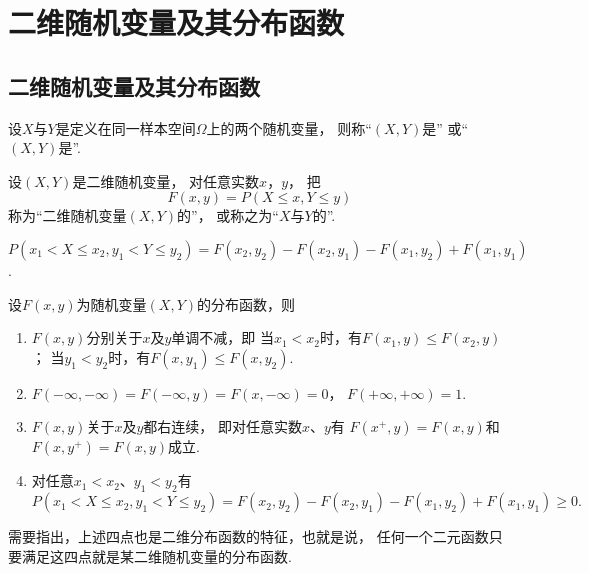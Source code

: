 \section{二维随机变量及其分布函数}
\subsection{二维随机变量及其分布函数}
\begin{definition}
设\(X\)与\(Y\)是定义在同一样本空间\(\Omega\)上的两个随机变量，
则称“\((X,Y)\)是”
或“\((X,Y)\)是”.
\end{definition}

\begin{definition}
设\((X,Y)\)是二维随机变量，
对任意实数\(x\)，\(y\)，
把\begin{equation}\label{equation:多维随机变量及其分布.二维分布函数的定义式}
	F(x,y) = P(X \leq x, Y \leq y)
\end{equation}
称为“二维随机变量\((X,Y)\)的”，
或称之为“\(X\)与\(Y\)的”.
\end{definition}

\begin{property}
\(P(x_1 < X \leq x_2, y_1 < Y \leq y_2)
= F(x_2,y_2) - F(x_2,y_1) - F(x_1,y_2) + F(x_1,y_1)\).
\end{property}

\begin{property}
设\(F(x,y)\)为随机变量\((X,Y)\)的分布函数，则
\begin{enumerate}
	\item \(F(x,y)\)分别关于\(x\)及\(y\)单调不减，即
	当\(x_1 < x_2\)时，有\(F(x_1,y) \leq F(x_2,y)\)；
	当\(y_1 < y_2\)时，有\(F(x,y_1) \leq F(x,y_2)\).

	\item \(F(-\infty,-\infty)=F(-\infty,y)=F(x,-\infty)=0\)，
	\(F(+\infty,+\infty)=1\).

	\item \(F(x,y)\)关于\(x\)及\(y\)都右连续，
	即对任意实数\(x\)、\(y\)有
	\(F(x^+,y)=F(x,y)\)和\(F(x,y^+)=F(x,y)\)成立.

	\item 对任意\(x_1 < x_2\)、\(y_1 < y_2\)有\[
		P(x_1 < X \leq x_2, y_1 < Y \leq y_2)
		= F(x_2,y_2) - F(x_2,y_1) - F(x_1,y_2) + F(x_1,y_1)
		\geq 0.
	\]
\end{enumerate}
\end{property}

需要指出，上述四点也是二维分布函数的特征，也就是说，
任何一个二元函数只要满足这四点就是某二维随机变量的分布函数.

